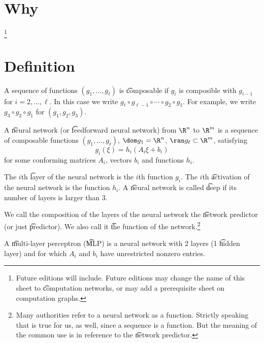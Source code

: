 
\section*{Why}
\footnote{Future editions will include. Future editions may change the name of this sheet to \t{computation networks}, or may add a prerequisite sheet on computation graphs.}
\section*{Definition}

A sequence of functions $(g_1, \dots , g_\ell )$ is \t{composable} if $g_i$ is composible with $g_{i-1}$ for $i = 2, \dots , \ell $.
In this case we write $g_\ell  \circ g_{\ell -1} \circ \cdots \circ g_2 \circ g_1$. For example, we write $g_3 \circ g_2 \circ g_1$ for $(g_1, g_2, g_3)$.

A \t{neural network} (or \t{feedforward neural network}) from $\R ^n$ to $\R ^m$ is a sequence of composable functions $(g_1, \dots , g_{\ell })$, $\dom g_1 = \R ^n$, $\ran g_\ell  \subset \R ^m$, satisfying
\[
g_i(\xi ) = h_i(A_i \xi  + b_i)
\]
for some conforming matrices $A_i$, vectors $b_i$ and functions $h_i$.

The $i$th \t{layer} of the neural network is the $i$th function $g_i$.
The $i$th \t{activation} of the neural network is the function $h_i$.
A \t{neural network} is called \t{deep} if its number of layers is larger than 3.

We call the composition of the layers of the neural network the \t{network predictor} (or just \t{predictor}).
We also call it \t{the function} of the network.\footnote{Many authorities refer to a neural network as a function. Strictly speaking that is true for us, as well, since a sequence is a function. But the meaning of the common use is in reference to the \t{network predictor}.}

A \t{multi-layer perceptron} (\t{MLP}) is a neural network with 2 layers (1 \t{hidden layer}) and for which $A_i$ and $b_i$ have unrestricted nonzero entries.


\blankpage